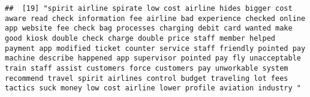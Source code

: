 \documentclass[
]{article}
\begin{document}
\begin{verbatim}
##  [19] "spirit airline spirate low cost airline hides bigger cost aware read check information fee airline bad experience checked online app website fee check bag processes charging debit card wanted make good kiosk double check charge double price staff member helped payment app modified ticket counter service staff friendly pointed pay machine describe happened app supervisor pointed pay fly unacceptable train staff assist customers force customers pay unworkable system recommend travel spirit airlines control budget traveling lot fees tactics suck money low cost airline lower profile aviation industry "                                                                                                                                                                                                                                                                                                                                                                                                                                                                                                                                                                                                                                                                                                                                                                                                                                                                                                                                                                                                                                                                                                                                                                  

\end{verbatim}
\end{document}
